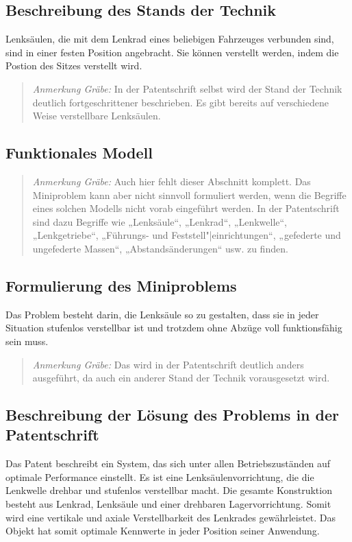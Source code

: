 \documentclass[11pt,a4paper]{article}
\newcommand{\HGG}[1]{\begin{quote} \emph{Anmerkung Gräbe:} #1  \end{quote}}
\begin{document}
\subsection{Beschreibung des Stands der Technik}
Lenksäulen, die mit dem Lenkrad eines beliebigen Fahrzeuges verbunden sind,
sind in einer festen Position angebracht. Sie können verstellt werden, indem
die Postion des Sitzes verstellt wird.

\HGG{In der Patentschrift selbst wird der Stand der Technik deutlich
  fortgeschrittener beschrieben.  Es gibt bereits auf verschiedene Weise
  verstellbare Lenksäulen.}

\subsection{Funktionales Modell}

\HGG{Auch hier fehlt dieser Abschnitt komplett. Das Miniproblem kann aber
  nicht sinnvoll formuliert werden, wenn die Begriffe eines solchen Modells
  nicht vorab eingeführt werden. In der Patentschrift sind dazu Begriffe wie
  „Lenksäule“, „Lenkrad“, „Lenkwelle“, „Lenkgetriebe“, „Führungs- und
  Feststell"|einrichtungen“, „gefederte und ungefederte Massen“,
  „Abstandsänderungen“ usw. zu finden.}

\subsection{Formulierung des Miniproblems}
Das Problem besteht darin, die Lenksäule so zu gestalten, dass sie in jeder
Situation stufenlos verstellbar ist und trotzdem ohne Abzüge voll
funktionsfähig sein muss.

\HGG{Das wird in der Patentschrift deutlich anders ausgeführt, da auch ein
  anderer Stand der Technik vorausgesetzt wird.}

\subsection{Beschreibung der Lösung des Problems in der Patentschrift}
Das Patent beschreibt ein System, das sich unter allen Betriebszuständen auf
optimale Performance einstellt. Es ist eine Lenksäulenvorrichtung, die die
Lenkwelle drehbar und stufenlos verstellbar macht.  Die gesamte Konstruktion
besteht aus Lenkrad, Lenksäule und einer drehbaren Lagervorrichtung.  Somit
wird eine vertikale und axiale Verstellbarkeit des Lenkrades gewährleistet.
Das Objekt hat somit optimale Kennwerte in jeder Position seiner Anwendung.
\end{document}
